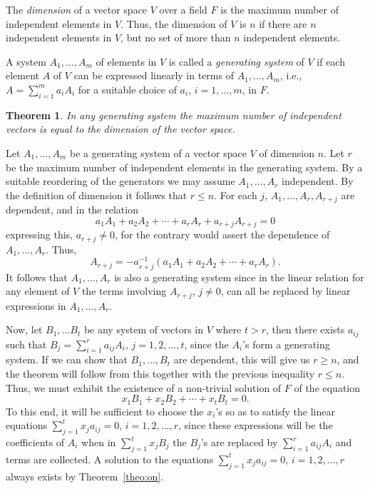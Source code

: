 \documentclass[10pt,leqno,a5paper]{book}
\newtheorem{theo}{Theorem}
\theoremstyle{definition}
\begin{document}
The \emph{dimension} of a vector space $V$ over a field $F$ is the maximum number of independent elements in $V$. Thus, the dimension of $V$ is $n$ if there are $n$ independent elements in $V$, but no set of more than $n$ independent elements.

A system $A_1, \ldots, A_m$ of elements in $V$ is called a \emph{generating system} of $V$ if each element $A$ of $V$ can be expressed linearly in terms of $A_1, \ldots, A_m$, i.e., $A = \sum_{i = 1}^m a_i A_i$ for a suitable choice of $a_i$, $i = 1,\ldots, m$, in $F$.


\begin{theo}
\label{theo:tw}
In any generating system the maximum number of independent vectors is equal to the dimension of the vector space.
\end{theo}

Let $A_1, \ldots, A_m$ be a generating system of a vector space $V$ of dimension $n$.
Let $r$ be the maximum number of independent elements in the generating system.
By a suitable reordering of the generators we may assume $A_1, \dots, A_r$ independent.
By the definition of dimension it follows that $r \leq n$.
For each $j$, $A_1, \ldots, A_r, A_{r+j}$ are dependent, and in the relation
\[
a_1 A_1 + a_2 A_2 + \cdots + a_r A_r + a_{r+j} A_{r+j} = 0
\]
expressing this, $a_{r+j} \not=0$, for the contrary would assert the dependence of $A_1, \ldots, A_r$.
Thus,
\[
A_{r+j} = -a_{r+j}^{-1}(a_1 A_1 + a_2 A_2 + \cdots + a_r A_r).
\]
It follows that $A_1, \ldots, A_r$ is also a generating system since in the linear relation for any element of $V$ the terms involving $A_{r+j}$, $j\not=0$, can all be replaced by linear expressions in $A_1, \ldots, A_r$.

Now, let $B_1, \ldots B_t$ be any system of vectors in $V$ where $t > r$, then there exists $a_{ij}$ such that $B_j = \sum_{i=1}^r a_{ij} A_i$, $j=1,2,\dots,t$, since the $A_i$'s form a generating system.
If we can show that $B_1, \ldots, B_t$ are dependent, this will give us $r \geq n$, and the theorem will follow from this together with the previous inequality $r \leq n$.
Thus, we must exhibit the existence of a non-trivial solution of $F$ of the equation
\[
x_1 B_1 + x_2 B_2 + \cdots + x_t B_t = 0.
\]
To this end, it will be sufficient to choose the $x_i$'s so as to satisfy the linear equations $\sum_{j=1}^t x_j a_{ij} = 0$, $i = 1,2,\dots,r$, since these expressions will be the coefficients of $A_i$ when in $\sum_{j=1}^t x_j B_j$ the $B_j$'s are replaced by $\sum_{i=1}^r a_{ij} A_i$ and terms are collected.
A solution to the equations $\sum_{j=1}^t x_j a_{ij} = 0$, $i = 1,2,\ldots,r$ always exists by Theorem~\ref{theo:on}.
\end{document}
